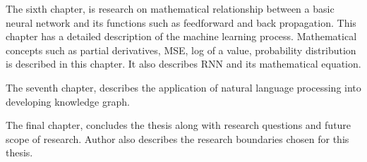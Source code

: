 The sixth chapter, is research on mathematical relationship between a basic neural network and its functions such as feedforward and back propagation. This chapter has a detailed description of the machine learning process. Mathematical concepts such as partial derivatives, \acl{MSE}, log of a value, probability distribution is described in this chapter. It also describes \acl{RNN} and its mathematical equation.  

The seventh chapter, describes the application of natural language processing into developing knowledge graph.

The final chapter, concludes the thesis along with research questions and future scope of research. Author also describes the research boundaries chosen for this thesis.  